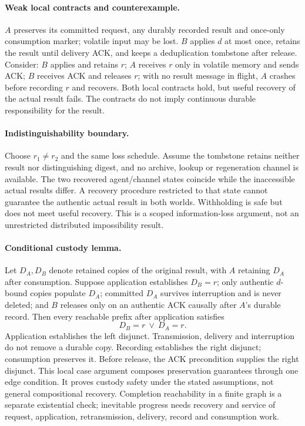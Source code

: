 \documentclass[11pt,a4paper]{article}
\theoremstyle{definition}
\theoremstyle{remark}
\begin{document}
\paragraph{Weak local contracts and counterexample.} $A$ preserves its committed request, any durably recorded result and once-only consumption marker; volatile input may be lost. $B$ applies $d$ at most once, retains the result until delivery ACK, and keeps a deduplication tombstone after release. Consider: $B$ applies and retains $r$; $A$ receives $r$ only in volatile memory and sends ACK; $B$ receives ACK and releases $r$; with no result message in flight, $A$ crashes before recording $r$ and recovers. Both local contracts hold, but useful recovery of the actual result fails. The contracts do not imply continuous durable responsibility for the result.

\paragraph{Indistinguishability boundary.} Choose $r_1\ne r_2$ and the same loss schedule. Assume the tombstone retains neither result nor distinguishing digest, and no archive, lookup or regeneration channel is available. The two recovered agent/channel states coincide while the inaccessible actual results differ. A recovery procedure restricted to that state cannot guarantee the authentic actual result in both worlds. Withholding is safe but does not meet useful recovery. This is a scoped information-loss argument, not an unrestricted distributed impossibility result.

\paragraph{Conditional custody lemma.} Let $D_A,D_B$ denote retained copies of the original result, with $A$ retaining $D_A$ after consumption. Suppose application establishes $D_B=r$; only authentic $d$-bound copies populate $D_A$; committed $D_A$ survives interruption and is never deleted; and $B$ releases only on an authentic ACK causally after $A$'s durable record. Then every reachable prefix after application satisfies
\[
D_B=r\ \lor\ D_A=r.
\]
Application establishes the left disjunct. Transmission, delivery and interruption do not remove a durable copy. Recording establishes the right disjunct; consumption preserves it. Before release, the ACK precondition supplies the right disjunct. This local case argument composes preservation guarantees through one edge condition. It proves custody safety under the stated assumptions, not general compositional recovery. Completion reachability in a finite graph is a separate existential check; inevitable progress needs recovery and service of request, application, retransmission, delivery, record and consumption work.
\end{document}
